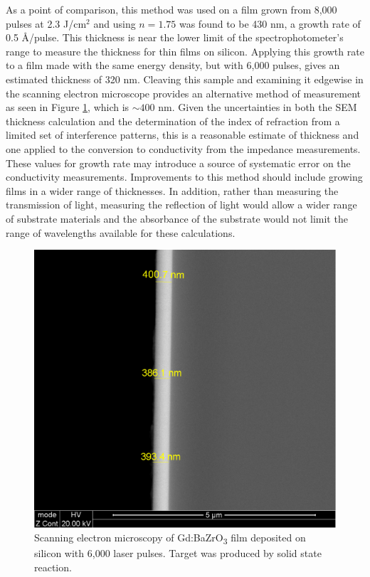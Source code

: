 As a point of comparison, this method was used on a film grown from 8,000 pulses at 2.3 J/cm$^2$ and using $n=1.75$ was found to be 430 nm, a growth rate of 0.5 \AA/pulse. This thickness is near the lower limit of the spectrophotometer's range to measure the thickness for thin films on silicon. Applying this growth rate to a film made with the same energy density, but with 6,000 pulses, gives an estimated thickness of 320 nm. Cleaving this sample and examining it edgewise in the scanning electron microscope provides an alternative method of measurement as seen in Figure \ref{fig:film:sem:thickness}, which is $\sim 400$ nm. Given the uncertainties in both the SEM thickness calculation and the determination of the index of refraction from a limited set of interference patterns, this is a reasonable estimate of thickness and one applied to the conversion to conductivity from the impedance measurements. These values for growth rate may introduce a source of systematic error on the conductivity measurements. Improvements to this method should include growing films in a wider range of thicknesses. In addition, rather than measuring the transmission of light, measuring the reflection of light would allow a wider range of substrate materials and the absorbance of the substrate would not limit the range of wavelengths available for these calculations.

\begin{figure}
    \centering
    \includegraphics[width=.7\linewidth]{Figures/BZG-XS10-Si_20000x_BSE_014.pdf}
    \caption{Scanning electron microscopy of Gd:BaZrO\textsubscript{3} film deposited on silicon with 6,000 laser pulses. Target was produced by solid state reaction.}
    \label{fig:film:sem:thickness}
\end{figure}